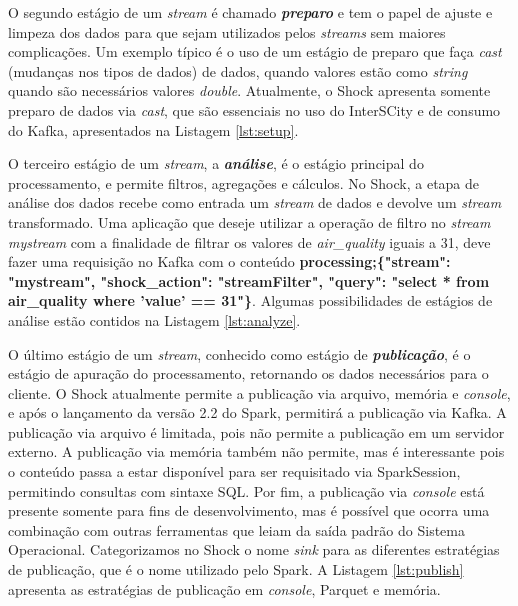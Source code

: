 

O segundo estágio de um \textit{stream} é chamado \textit{\textbf{preparo}} e tem o papel
de ajuste e limpeza dos dados para que sejam utilizados pelos \textit{streams}
sem maiores complicações. Um exemplo típico é o uso de um estágio de preparo
que faça \textit{cast} (mudanças nos tipos de dados) de dados, quando valores estão como
\textit{string} quando são necessários valores \textit{double}. Atualmente,
o Shock apresenta somente preparo de dados via \textit{cast}, que são essenciais
no uso do InterSCity e de consumo do Kafka, apresentados na Listagem
\ref{lst:setup}.



O terceiro estágio de um \textit{stream}, a \textit{\textbf{análise}}, é o
estágio principal do processamento, e permite filtros, agregações e cálculos.
No Shock, a etapa de análise dos dados recebe como entrada um \textit{stream}
de dados e devolve um \textit{stream} transformado. Uma aplicação que deseje
utilizar a operação de filtro no \textit{stream} \textit{mystream} com a finalidade
de filtrar os valores de \textit{air\_quality} iguais a 31, deve fazer uma
requisição no Kafka com o conteúdo \small{\textbf{processing;\{"stream": "mystream",
"shock\_action": "streamFilter", "query": "select * from air\_quality where
'value' == 31"\}}}. Algumas possibilidades de estágios de análise
estão contidos na Listagem \ref{lst:analyze}.

\pagebreak



O último estágio de um \textit{stream}, conhecido como estágio de
\textit{\textbf{publicação}}, é o estágio
de apuração do processamento, retornando os dados necessários para o cliente.
O Shock atualmente permite a publicação via arquivo, memória e \textit{console}, e após o
lançamento da versão 2.2 do Spark, permitirá a publicação via Kafka. A
publicação via arquivo é limitada, pois não permite a publicação em um servidor
externo. A publicação via memória também não permite, mas é interessante pois
o conteúdo passa a estar disponível para ser requisitado via SparkSession,
permitindo consultas com sintaxe SQL. Por fim, a publicação via \textit{console} está
presente somente para fins de desenvolvimento, mas é possível que ocorra uma
combinação com outras ferramentas que leiam da saída padrão do Sistema Operacional.
Categorizamos no Shock o nome \textit{sink} para as diferentes estratégias de
publicação, que é o nome utilizado pelo Spark. A Listagem \ref{lst:publish}
apresenta as estratégias de publicação em \textit{console}, Parquet e memória.

